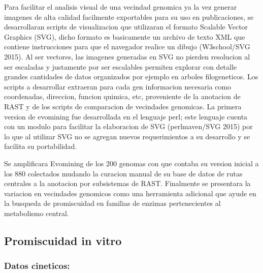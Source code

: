 \documentclass[12pt,twoside]{reedthesis}
\begin{document}
  Para facilitar el analisis visual de una vecindad genomica ya la vez
  generar imagenes de alta calidad facilmente exportables para su uso en
  publicaciones, se desarrollaran scripts de visualizacion que utilizaran
  el formato Scalable Vector Graphics (SVG), dicho formato es basicamente
  un archivo de texto XML que contiene instrucciones para que el navegador
  realice un dibujo (W3school/SVG 2015). Al ser vectores, las imagenes
  generadas en SVG no pierden resolucion al ser escaladas y justamente por
  ser escalables permiten explorar con detalle grandes cantidades de datos
  organizados por ejemplo en arboles filogeneticos. Los scripts a
  desarrollar extraeran para cada gen informacion necesaria como
  coordenadas, direccion, funcion quimica, etc, proveniente de la
  anotacion de RAST y de los scripts de comparacion de vecindades
  genomicas. La primera version de evomining fue desarrollada en el
  lenguaje perl; este lenguaje cuenta con un modulo para facilitar la
  elaboracion de SVG (perlmaven/SVG 2015) por lo que al utilizar SVG no se
  agregan nuevos requerimientos a su desarrollo y se facilita su
  portabilidad.
  
  Se amplificara Evomining de los 200 genomas con que contaba su version
  inicial a los 880 colectados mudando la curacion manual de su base de
  datos de rutas centrales a la anotacion por subsistemas de RAST.
  Finalmente se presentara la variacion en vecindades genomicos como una
  herramienta adicional que ayude en la busqueda de promiscuidad en
  familias de enzimas pertenecientes al metabolismo central.
  
  \subsection{Promiscuidad in vitro}\label{promiscuidad-in-vitro}
  
  \subsubsection{Datos cineticos:}\label{datos-cineticos}
  
\end{document}
